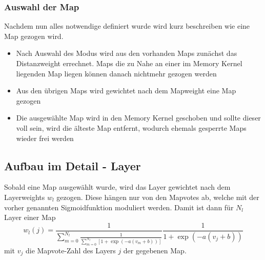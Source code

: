         \subsubsection{Auswahl der Map}
            Nachdem nun alles notwendige definiert wurde wird kurz beschreiben wie eine Map gezogen wird.
            \begin{itemize}
                \item Nach Auswahl des Modus wird aus den vorhanden Maps zunächst das Distanzweight errechnet. Maps die zu Nahe an einer im Memory Kernel liegenden Map liegen können danach nichtmehr gezogen werden 
                \item Aus den übrigen Maps wird gewichtet nach dem Mapweight eine Map gezogen 
                \item Die ausgewählte Map wird in den Memory Kernel geschoben und sollte dieser voll sein, wird die älteste Map entfernt, wodurch ehemals gesperrte Maps wieder frei werden
            \end{itemize}
    \subsection{Aufbau im Detail - Layer}
    Sobald eine Map ausgewählt wurde, wird das Layer gewichtet nach dem Layerweights $w_l$ gezogen. 
    Diese hängen nur von den Mapvotes  ab, welche mit der vorher genannten Sigmoidfunktion moduliert werden.
    Damit ist dann für $N_l$ Layer einer Map 
    \begin{equation}
        w_l(j) = \frac{1}{\sum_{m=0}^{N_l}\frac{1}{\sum_{m=0}^{N_l}\left[1+\exp\left(-a(v_m+b)\right)\right]}}\frac{1}{1+\exp\left(-a(v_j+b)\right)}
    \end{equation} 
    mit $v_j$ die Mapvote-Zahl des Layers $j$ der gegebenen Map.
